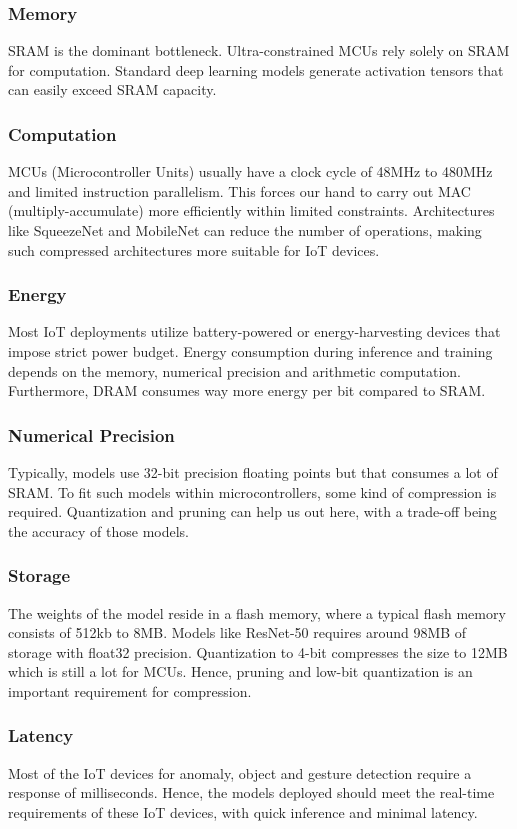 \documentclass[conference]{IEEEtran}
\begin{document}
	\subsubsection{Memory} SRAM is the dominant bottleneck. Ultra-constrained MCUs rely solely on SRAM for computation. Standard deep learning models generate activation tensors that can easily exceed SRAM capacity.
	\subsubsection{Computation} MCUs (Microcontroller Units) usually have a clock cycle of 48MHz to 480MHz and limited instruction parallelism. This forces our hand to carry out MAC (multiply-accumulate) more efficiently within limited constraints. Architectures like SqueezeNet \cite{squeezenet2016} and MobileNet \cite{mobilenet2017} can reduce the number of operations, making such compressed architectures more suitable for IoT devices.
	\subsubsection{Energy} Most IoT deployments utilize battery-powered or energy-harvesting devices that impose strict power budget. Energy consumption during inference and training depends on the memory, numerical precision and arithmetic computation. Furthermore, DRAM consumes way more energy per bit compared to SRAM.
	\subsubsection{Numerical Precision} Typically, models use 32-bit precision floating points but that consumes a lot of SRAM. To fit such models within microcontrollers, some kind of compression is required. Quantization and pruning can help us out here, with a trade-off being the accuracy of those models.
	\subsubsection{Storage} The weights of the model reside in a flash memory, where a typical flash memory consists of 512kb to 8MB. Models like ResNet-50 \cite{resnet2016} requires around 98MB of storage with float32 precision. Quantization to 4-bit compresses the size to 12MB which is still a lot for MCUs. Hence, pruning and low-bit quantization is an important requirement for compression.
	\subsubsection{Latency} Most of the IoT devices for anomaly, object and gesture detection require a response of milliseconds. Hence, the models deployed should meet the real-time requirements of these IoT devices, with quick inference and minimal latency.
	
\end{document}
